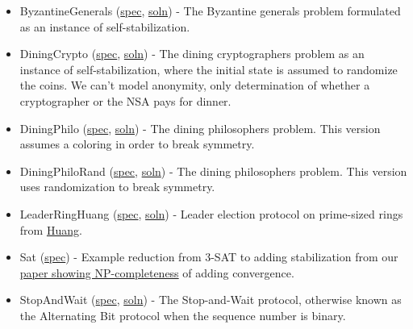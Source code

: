 \begin{itemize}
\item ByzantineGenerals (\href{\examplespec/ByzantineGenerals.prot}{spec}, \href{\examplesoln/ByzantineGenerals.prot}{soln})
- The Byzantine generals problem formulated as an instance of self-stabilization.
\item DiningCrypto (\href{\examplespec/DiningCrypto.prot}{spec}, \href{\examplesoln/DiningCrypto.prot}{soln})
- The dining cryptographers problem as an instance of self-stabilization, where the initial state is assumed to randomize the coins.
We can't model anonymity, only determination of whether a cryptographer or the NSA pays for dinner.
\item DiningPhilo (\href{\examplespec/DiningPhilo.prot}{spec}, \href{\examplesoln/DiningPhilo.prot}{soln})
- The dining philosophers problem. This version assumes a coloring in order to break symmetry.
\item DiningPhiloRand (\href{\examplespec/DiningPhiloRand.prot}{spec}, \href{\examplesoln/DiningPhiloRand.prot}{soln})
- The dining philosophers problem. This version uses randomization to break symmetry.
\item LeaderRingHuang (\href{\examplespec/LeaderRingHuang.prot}{spec}, \href{\examplesoln/LeaderRingHuang.prot}{soln})
- Leader election protocol on prime-sized rings from \href{http://dx.doi.org/10.1145/169683.174161}{Huang}.
\item Sat (\href{\examplespec/Sat.prot}{spec})
- Example reduction from 3-SAT to adding stabilization from our \href{http://dx.doi.org/10.1007/978-3-642-40213-5_2}{paper showing NP-completeness} of adding convergence.
\item StopAndWait (\href{\examplespec/StopAndWait.prot}{spec}, \href{\examplesoln/StopAndWait.prot}{soln})
- The Stop-and-Wait protocol, otherwise known as the Alternating Bit protocol when the sequence number is binary.
\end{itemize}



